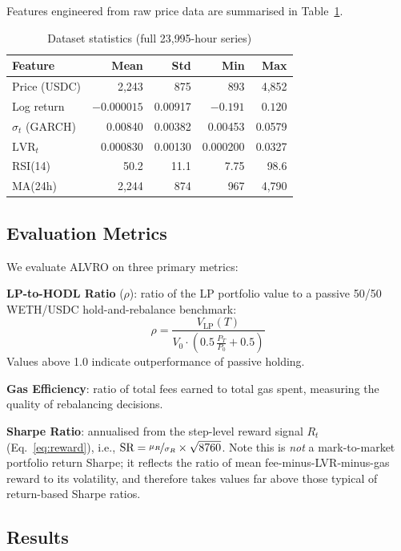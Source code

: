 \documentclass{article}
\begin{document}
Features engineered from raw price data are summarised in
Table~\ref{tab:dataset}.

\begin{table}[h]
\centering
\caption{Dataset statistics (full 23{,}995-hour series)}
\label{tab:dataset}
\begin{tabular}{lrrrr}
\toprule
Feature & Mean & Std & Min & Max \\
\midrule
Price (USDC) & 2{,}243 & 875 & 893 & 4{,}852 \\
Log return & $-0.000015$ & 0.00917 & $-0.191$ & $0.120$ \\
$\sigma_t$ (GARCH) & 0.00840 & 0.00382 & 0.00453 & 0.0579 \\
$\text{LVR}_t$ & 0.000830 & 0.00130 & 0.000200 & 0.0327 \\
RSI(14) & 50.2 & 11.1 & 7.75 & 98.6 \\
MA(24h) & 2{,}244 & 874 & 967 & 4{,}790 \\
\bottomrule
\end{tabular}
\end{table}

\subsection{Evaluation Metrics}

We evaluate ALVRO on three primary metrics:

\textbf{LP-to-HODL Ratio} ($\rho$): ratio of the LP portfolio value to a
passive 50/50 WETH/USDC hold-and-rebalance benchmark:
\begin{equation}
  \rho = \frac{V_{\text{LP}}(T)}{V_0 \cdot \left(0.5\,\frac{P_T}{P_0} + 0.5\right)}
\end{equation}
Values above 1.0 indicate outperformance of passive holding.

\textbf{Gas Efficiency}: ratio of total fees earned to total gas spent,
measuring the quality of rebalancing decisions.

\textbf{Sharpe Ratio}: annualised from the step-level reward signal $R_t$
(Eq.~\ref{eq:reward}), i.e., $\text{SR} = \nicefrac{\mu_R}{\sigma_R} \times \sqrt{8760}$.
Note this is \emph{not} a mark-to-market portfolio return Sharpe; it reflects
the ratio of mean fee-minus-LVR-minus-gas reward to its volatility, and
therefore takes values far above those typical of return-based Sharpe ratios.

\subsection{Results}
\end{document}
